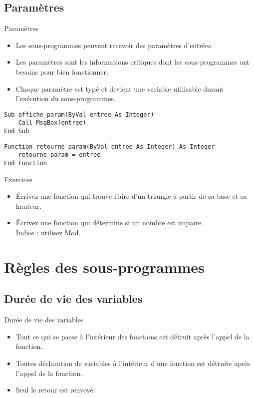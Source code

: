 \documentclass[aspectratio=169,usenames,dvipsnames]{beamer}
\begin{document}
    \subsection{Paramètres}
    \begin{frame}[fragile]{Paramètres}
        \begin{itemize}
            \item Les sous-programmes peuvent recevoir des paramètres d’entrées.
            \item Les paramètres sont les informations critiques dont les sous-programmes ont besoins pour bien fonctionner.
            \item Chaque paramètre est typé et devient une variable utilisable durant l’exécution du sous-programmes.
        \end{itemize}
\begin{lstlisting}
Sub affiche_param(ByVal entree As Integer)
    Call MsgBox(entree)
End Sub
\end{lstlisting}
\begin{lstlisting}
Function retourne_param(ByVal entree As Integer) As Integer
    retourne_param = entree
End Function
\end{lstlisting}

    \end{frame}
    \begin{frame}{Exercices}
        \begin{itemize}
            \item Écrivez une fonction qui trouve l’aire d’un triangle à partir de sa base et sa hauteur.
            \item Écrivez une fonction qui détermine si un nombre est impaire. \\Indice : utilisez Mod.
\end{itemize}
    \end{frame}
    \section{Règles des sous-programmes}
    \subsection{Durée de vie des variables}
    \begin{frame}[fragile]{Durée de vie des variables}
        \begin{itemize}
            \item Tout ce qui se passe à l'intérieur des fonctions est détruit après l'appel de la fonction.
            \item Toutes déclaration de variables à l'intérieur d'une fonction est détruite après l'appel de la fonction.
            \item Seul le retour est renvoyé.
        \end{itemize}
    \end{frame}
\end{document}
